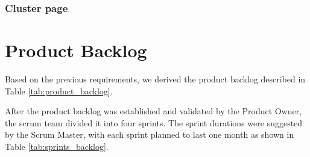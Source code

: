 

\subsubsection{Cluster page}




\section{Product Backlog}

Based on the previous requirements, we derived the product backlog described in Table \ref{tab:product_backlog}.

After the product backlog was established and validated by the Product Owner, the scrum team divided it into four sprints. The sprint durations were suggested by the Scrum Master, with each sprint planned to last one month as shown in Table \ref{tab:sprints_backlog}.

